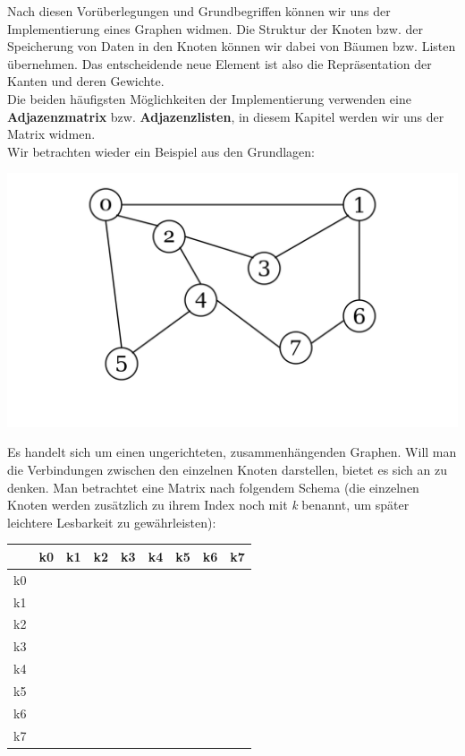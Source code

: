 \documentclass{article}
\begin{document}
Nach diesen Vorüberlegungen und Grundbegriffen können wir uns der Implementierung eines Graphen widmen. Die Struktur der Knoten bzw. der Speicherung von Daten in den Knoten können wir dabei von Bäumen bzw. Listen übernehmen. Das entscheidende neue Element ist also die Repräsentation der Kanten und deren Gewichte. \\

Die beiden häufigsten Möglichkeiten der Implementierung verwenden eine \textbf{Adjazenzmatrix} bzw. \textbf{Adjazenzlisten}, in diesem Kapitel werden wir uns der Matrix widmen. \\
Wir betrachten wieder ein Beispiel aus den Grundlagen:
\begin{center}
    \includegraphics[scale=0.15]{../../media/matrix_1.png}
\end{center}
Es handelt sich um einen ungerichteten, zusammenhängenden Graphen. Will man die Verbindungen zwischen den einzelnen Knoten darstellen, bietet es sich an  zu denken. Man betrachtet eine Matrix nach folgendem Schema (die einzelnen Knoten werden zusätzlich zu ihrem Index noch mit \textit{k} benannt, um später leichtere Lesbarkeit zu gewährleisten): 
\begin{center}
\begin{tabular}{|c|c|c|c|c|c|c|c|c|}
    \hline 
        & k0 & k1 & k2 & k3 & k4 & k5 & k6 & k7  \\
    \hline 
    k0 & & & & & & & & \\
    \hline 
    k1 & & & & & & & &\\
    \hline 
    k2 & & & & & & & &\\
    \hline 
    k3 & & & & & & & &\\
    \hline 
    k4 & & & & & & & &\\
    \hline 
    k5 & & & & & & & &\\
    \hline 
    k6 & & & & & & & &\\
    \hline 
    k7 & & & & & & & &\\
    \hline 
\end{tabular} 
\end{center}
\end{document}
